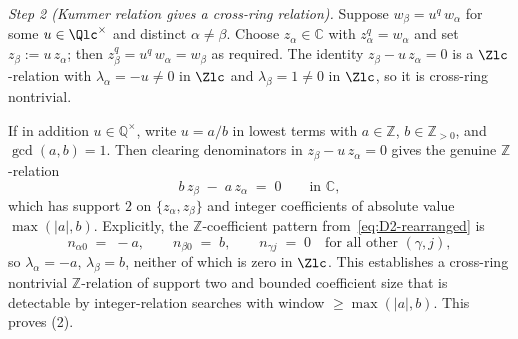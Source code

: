 

\smallskip
\textit{Step 2 (Kummer relation gives a cross-ring relation).}
Suppose $w_\beta = u^q\, w_\alpha$ for some $u \in \Qlc^\times$ and
distinct $\alpha \ne \beta$. Choose $z_\alpha \in \mathbb{C}$ with
$z_\alpha^q = w_\alpha$ and set $z_\beta := u\, z_\alpha$; then
$z_\beta^q = u^q\, w_\alpha = w_\beta$ as required. The identity
$z_\beta - u\, z_\alpha = 0$ is a $\Zlc$-relation with $\lambda_\alpha
= -u \ne 0$ in $\Zlc$ and $\lambda_\beta = 1 \ne 0$ in $\Zlc$, so it
is cross-ring nontrivial.

If in addition $u \in \mathbb{Q}^\times$, write $u = a / b$ in lowest
terms with $a \in \mathbb{Z}$, $b \in \mathbb{Z}_{> 0}$, and
$\gcd(a, b) = 1$. Then clearing denominators in $z_\beta - u\, z_\alpha
= 0$ gives the genuine $\mathbb{Z}$-relation
\begin{equation}\label{eq:D2-Z-relation}
   b\, z_\beta \;-\; a\, z_\alpha \;=\; 0
   \qquad \text{in } \mathbb{C},
\end{equation}
which has support $2$ on $\{z_\alpha, z_\beta\}$ and integer
coefficients of absolute value $\max(|a|, b)$. Explicitly, the
$\mathbb{Z}$-coefficient pattern from~\eqref{eq:D2-rearranged} is
\[
   n_{\alpha 0} \;=\; -a, \qquad
   n_{\beta 0}  \;=\; b, \qquad
   n_{\gamma j} \;=\; 0 \quad
   \text{for all other } (\gamma, j),
\]
so $\lambda_\alpha = -a$, $\lambda_\beta = b$, neither of which is
zero in $\Zlc$. This establishes a cross-ring nontrivial
$\mathbb{Z}$-relation of support two and bounded coefficient size
that is detectable by integer-relation searches with window
$\ge \max(|a|, b)$. This proves (2).

